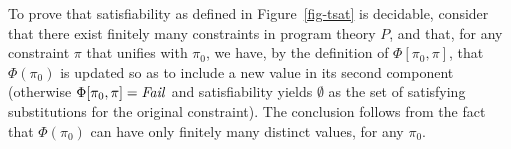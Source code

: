 To prove that satisfiability as defined in Figure~\ref{fig-tsat} is
decidable, consider that there exist finitely many constraints in
program theory $P$, and that, for any constraint $\pi$ that unifies
with $\pi_0$, we have, by the definition of $\Phi[\pi_0,\pi]$, that
$\Phi(\pi_0)$ is updated so as to include a new value in its second
component (otherwise $\Phi[\pi_0,\pi] = \text{\it Fail\/}$ and
satisfiability yields $\emptyset$ as the set of satisfying
substitutions for the original constraint). The conclusion follows
from the fact that $\Phi(\pi_0)$ can have only finitely many distinct
values, for any $\pi_0$.

